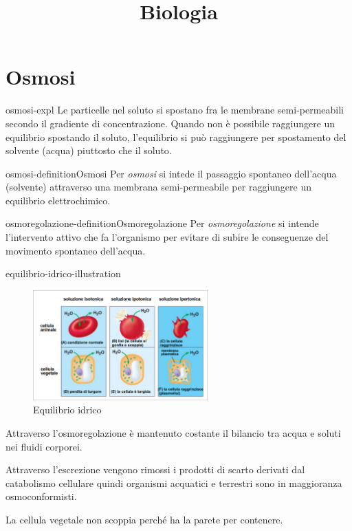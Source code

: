 \documentclass[preview]{standalone}
\begin{document}
\title{Biologia}
\genpage

\section{Osmosi}

\begin{snippet}{osmosi-expl}
    Le particelle nel soluto si spostano fra le membrane semi-permeabili secondo il gradiente
di concentrazione. Quando non è possibile raggiungere un equilibrio spostando il soluto,
l'equilibrio si può raggiungere per spostamento del solvente (acqua) piuttosto che il soluto.
\end{snippet}

\begin{snippetdefinition}{osmosi-definition}{Osmosi}
    Per \textit{osmosi} si intede il passaggio spontaneo dell'acqua (solvente) attraverso una membrana semi-permeabile
    per raggiungere un equilibrio elettrochimico.
\end{snippetdefinition}

\begin{snippetdefinition}{osmoregolazione-definition}{Osmoregolazione}
    Per \textit{osmoregolazione} si intende l'intervento attivo che fa l'organismo per evitare di subire le conseguenze del movimento spontaneo dell'acqua.
\end{snippetdefinition}

\begin{snippet}{equilibrio-idrico-illustration}
    \setlength{\intextsep}{0pt}%
    \begin{figure}
        \includegraphics[width=0.6\textwidth]{./resources/equilibrio_idrico.png}
        \caption{Equilibrio idrico}
        \vspace{-1cm}
    \end{figure}

    Attraverso l'osmoregolazione è mantenuto costante il bilancio tra acqua e soluti
    nei fluidi corporei.

    Attraverso l'escrezione vengono rimossi i prodotti di scarto
    derivati dal catabolismo cellulare quindi organismi acquatici e terrestri sono in
    maggioranza osmoconformisti.

    La cellula vegetale non scoppia perché ha la parete per contenere.

    \wrapfill
\end{snippet}
\end{document}
